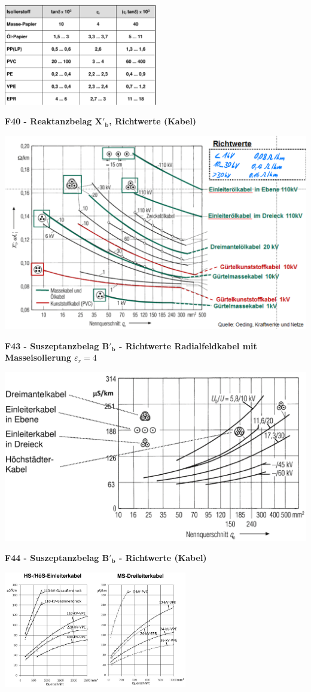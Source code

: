 \centering
\includegraphics[width=0.5\textwidth]{figures/f42_verlustfaktor_e-konstante_isostoffe.png}

\raggedright
\textbf{F40 - Reaktanzbelag $\mathbf{X'_b}$, Richtwerte (Kabel)}

\centering
\includegraphics[width=0.7\columnwidth]{figures/f39_reaktanzbelag_kabel.png}

\raggedright
\textbf{F43 - Suszeptanzbelag $\mathbf{B'_b}$ - Richtwerte Radialfeldkabel mit Masseisolierung $\varepsilon_r = 4$}

\centering
\includegraphics[width=0.7\columnwidth]{figures/f43_kabel_radialfeldkabel_masseiso.png}

\raggedright
\textbf{F44 - Suszeptanzbelag $\mathbf{B'_b}$ - Richtwerte (Kabel)}

\centering
\includegraphics[width=0.6\textwidth]{figures/f44_suszeptanzbelag_weitere_kabeltypen.png}

\raggedright
